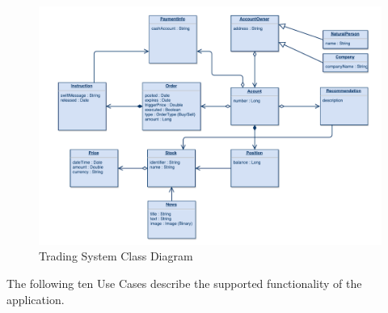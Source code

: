\begin{figure}[H]
	\includegraphics[scale=0.5]{diagrams/TradingSystem.pdf}
	\caption{Trading System Class Diagram}
	\label{fig:tradingClasses}
\end{figure}

The following ten Use Cases describe the supported functionality of the application.


